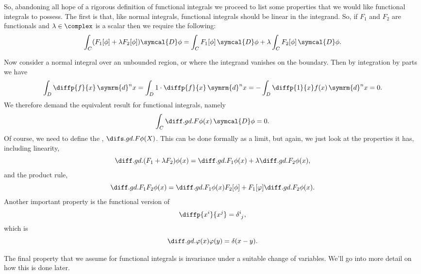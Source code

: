 \documentclass[fleqn]{NotesClass}
\renewcommand{\dd}[1]{\,\symrm{d}#1}
\newcommand{\DL}{\symcal{D}}
\newcommand{\DD}{\,\symcal{D}}
\begin{document}
    So, abandoning all hope of a rigorous definition of functional integrals we proceed to list some properties that we would like functional integrals to possess.
    The first is that, like normal integrals, functional integrals should be linear in the integrand.
    So, if \(F_1\) and \(F_2\) are functionals and \(\lambda \in \complex\) is a scalar then we require the following:
    \begin{equation}
        \int_C (F_1[\phi] + \lambda F_2[\phi]) \DL\phi = \int_C F_1[\phi] \DD\phi + \lambda \int_C F_2[\phi] \DD\phi.
    \end{equation}
    
    Now consider a normal integral over an unbounded region, or where the integrand vanishes on the boundary.
    Then by integration by parts we have
    \begin{equation}
        \int_D \diffp{f}{x} \dd{^nx} = \int_D 1 \cdot \diffp{f}{x} \dd{^nx} = - \int_D \diffp{1}{x} f(x) \dd{^nx} = 0.
    \end{equation}
    We therefore demand the equivalent result for functional integrals, namely
    \begin{equation}
        \int_C \diffd{F}{\phi(x)} \DD\phi = 0.
    \end{equation}
    Of course, we need to define the , \(\difsd{F}{\phi(X)}\).
    This can be done formally as a limit, but again, we just look at the properties it has, including linearity,
    \begin{equation}
        \diffd{(F_1 + \lambda F_2)}{\phi(x)} = \diffd{F_1}{\phi(x)} + \lambda \diffd{F_2}{\phi(x)},
    \end{equation}
    and the product rule,
    \begin{equation}
        \diffd{F_1F_2}{\phi(x)} = \diffd{F_1}{\phi(x)} F_2[\phi] + F_1[\varphi] \diffd{F_2}{\phi(x)}.
    \end{equation}
    Another important property is the functional version of
    \begin{equation}
        \diffp{x^i}{x^j} = \tensor{\delta}{^i_j},
    \end{equation}
    which is
    \begin{equation}
        \diffd{\varphi(x)}{\varphi(y)} = \delta(x - y).
    \end{equation}
    
    The final property that we assume for functional integrals is invariance under a suitable change of variables.
    We'll go into more detail on how this is done later.
    
\end{document}

